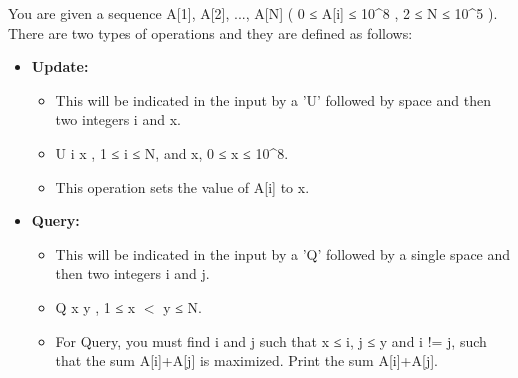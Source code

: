 You are given a sequence A[1], A[2], ..., A[N] ( 0 ≤ A[i] ≤ 10^8 , 2 ≤ N ≤ 10^5 ). There are two types of operations and they are defined as follows:
\begin{itemize}
	\item \textbf{Update: }
\begin{itemize}
	\item \textbf{​}This will be indicated in the input by a 'U' followed by space and then two integers i and x.
	\item U i x , 1 ≤ i ≤ N, and x, 0 ≤ x ≤ 10^8.
	\item This operation sets the value of A[i] to x.
\end{itemize}
	\item \textbf{Query:}
\begin{itemize}
	\item This will be indicated in the input by a 'Q' followed by a single space and then two integers i and j.
	\item Q x y , 1 ≤ x $<$ y ≤ N.
	\item For Query, you must find i and j such that x ≤ i, j ≤ y and i != j, such that the sum A[i]+A[j] is maximized. Print the sum A[i]+A[j].
\end{itemize}
\end{itemize}